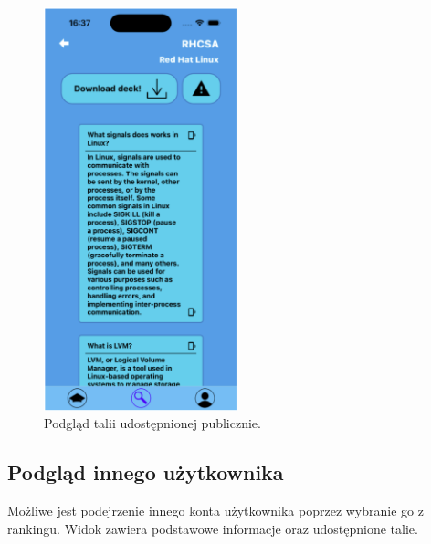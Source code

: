 \begin{figure}[H]
    \centering
    \includegraphics[width=0.5\textwidth]{chapters/chapter_10/images_mobile/mobile_public_deck}
    \caption{Podgląd talii udostępnionej publicznie.}
    \label{img:mobile_public_deck}
\end{figure}

\subsection{Podgląd innego użytkownika}
Możliwe jest podejrzenie innego konta użytkownika poprzez wybranie go z rankingu. Widok zawiera podstawowe informacje oraz udostępnione talie.


